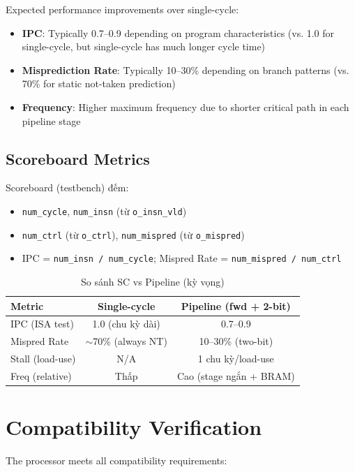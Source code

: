 Expected performance improvements over single-cycle:
\begin{itemize}
    \item \textbf{IPC}: Typically 0.7--0.9 depending on program characteristics (vs. 1.0 for single-cycle, but single-cycle has much longer cycle time)
    \item \textbf{Misprediction Rate}: Typically 10--30\% depending on branch patterns (vs. 70\% for static not-taken prediction)
    \item \textbf{Frequency}: Higher maximum frequency due to shorter critical path in each pipeline stage
\end{itemize}

\subsection{Scoreboard Metrics}
Scoreboard (testbench) đếm:
\begin{itemize}
    \item \texttt{num\_cycle}, \texttt{num\_insn} (từ \texttt{o\_insn\_vld})
    \item \texttt{num\_ctrl} (từ \texttt{o\_ctrl}), \texttt{num\_mispred} (từ \texttt{o\_mispred})
    \item IPC = \texttt{num\_insn / num\_cycle}; Mispred Rate = \texttt{num\_mispred / num\_ctrl}
\end{itemize}

\begin{table}[ht]
\centering
\caption{So sánh SC vs Pipeline (kỳ vọng)}
\begin{tabular}{lcc}
\toprule
Metric & Single-cycle & Pipeline (fwd + 2-bit) \\
\midrule
IPC (ISA test) & 1.0 (chu kỳ dài) & 0.7--0.9 \\
Mispred Rate & $\sim$70\% (always NT) & 10--30\% (two-bit) \\
Stall (load-use) & N/A & 1 chu kỳ/load-use \\
Freq (relative) & Thấp & Cao (stage ngắn + BRAM) \\
\bottomrule
\end{tabular}
\end{table}

\section{Compatibility Verification}

The processor meets all compatibility requirements:

